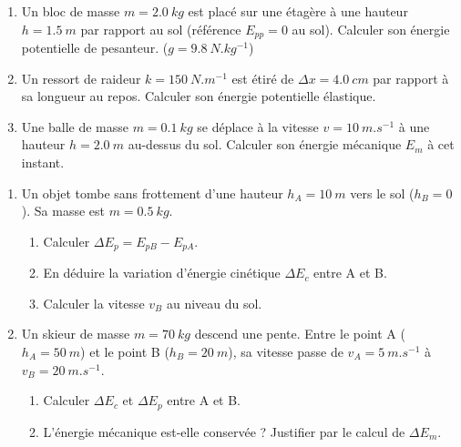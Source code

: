 \documentclass[11pt]{article}
\begin{document}
\begin{exercice}
\begin{enumerate}
    \item Un bloc de masse $m = \SI{2,0}{kg}$ est placé sur une étagère à une hauteur $h = \SI{1,5}{m}$ par rapport au sol (référence $E_{pp}=0$ au sol). Calculer son énergie potentielle de pesanteur. ($g = \SI{9,8}{N.kg^{-1}}$)
    \item Un ressort de raideur $k = \SI{150}{N.m^{-1}}$ est étiré de $\Delta x = \SI{4,0}{cm}$ par rapport à sa longueur au repos. Calculer son énergie potentielle élastique.
    \item Une balle de masse $m = \SI{0,1}{kg}$ se déplace à la vitesse $v = \SI{10}{m.s^{-1}}$ à une hauteur $h = \SI{2,0}{m}$ au-dessus du sol. Calculer son énergie mécanique $E_m$ à cet instant.
\end{enumerate}
\end{exercice}

\begin{exercice}
\begin{enumerate}
    \item Un objet tombe sans frottement d'une hauteur $h_A = \SI{10}{m}$ vers le sol ($h_B = 0$). Sa masse est $m = \SI{0,5}{kg}$.
    \begin{enumerate}
        \item Calculer $\Delta E_p = E_{pB} - E_{pA}$.
        \item En déduire la variation d'énergie cinétique $\Delta E_c$ entre A et B.
        \item Calculer la vitesse $v_B$ au niveau du sol.
    \end{enumerate}
    \item Un skieur de masse $m = \SI{70}{kg}$ descend une pente. Entre le point A ($h_A = \SI{50}{m}$) et le point B ($h_B = \SI{20}{m}$), sa vitesse passe de $v_A = \SI{5}{m.s^{-1}}$ à $v_B = \SI{20}{m.s^{-1}}$.
    \begin{enumerate}
        \item Calculer $\Delta E_c$ et $\Delta E_p$ entre A et B.
        \item L'énergie mécanique est-elle conservée ? Justifier par le calcul de $\Delta E_m$.
    \end{enumerate}
\end{enumerate}
\end{exercice}
\end{document}
